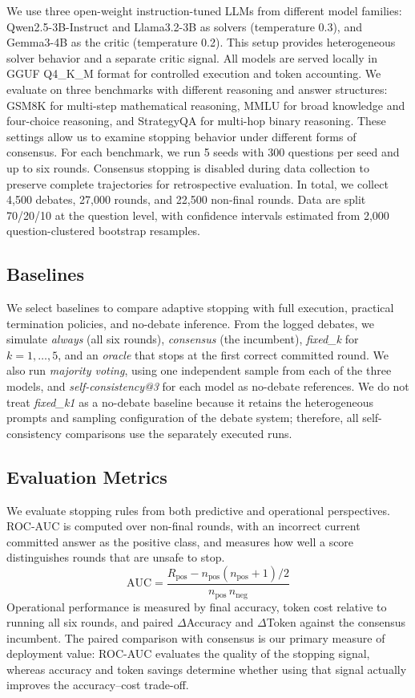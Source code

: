 \documentclass{llncs}
\begin{document}
We use three open-weight instruction-tuned LLMs from different model families: Qwen2.5-3B-Instruct and Llama3.2-3B as solvers (temperature 0.3), and Gemma3-4B as the critic (temperature 0.2). This setup provides heterogeneous solver behavior and a separate critic signal. All models are served locally in GGUF Q4\_K\_M format for controlled execution and token accounting. We evaluate on three benchmarks with different reasoning and answer structures: GSM8K for multi-step mathematical reasoning, MMLU for broad knowledge and four-choice reasoning, and StrategyQA for multi-hop binary reasoning. These settings allow us to examine stopping behavior under different forms of consensus. For each benchmark, we run 5 seeds with 300 questions per seed and up to six rounds. Consensus stopping is disabled during data collection to preserve complete trajectories for retrospective evaluation. In total, we collect 4,500 debates, 27,000 rounds, and 22,500 non-final rounds. Data are split 70/20/10 at the question level, with confidence intervals estimated from 2,000 question-clustered bootstrap resamples.

\subsection{Baselines}
\label{sec:baselines}

We select baselines to compare adaptive stopping with full execution, practical termination policies, and no-debate inference. From the logged debates, we simulate \emph{always} (all six rounds), \emph{consensus} (the incumbent), \emph{fixed\_k} for $k=1,\ldots,5$, and an \emph{oracle} that stops at the first correct committed round. We also run \emph{majority voting}, using one independent sample from each of the three models, and \emph{self-consistency@3} \cite{ref_10} for each model as no-debate references. We do not treat \emph{fixed\_k1} as a no-debate baseline because it retains the heterogeneous prompts and sampling configuration of the debate system; therefore, all self-consistency comparisons use the separately executed runs.

\subsection{Evaluation Metrics}

We evaluate stopping rules from both predictive and operational perspectives. ROC-AUC is computed over non-final rounds, with an incorrect current committed answer as the positive class, and measures how well a score distinguishes rounds that are unsafe to stop. 
\begin{equation}
\mathrm{AUC} = \frac{R_\text{pos} - n_\text{pos}(n_\text{pos}+1)/2}{n_\text{pos}\, n_\text{neg}}
\label{eq:auc}
\end{equation}
Operational performance is measured by final accuracy, token cost relative to running all six rounds, and paired $\Delta$Accuracy and $\Delta$Token against the consensus incumbent. The paired comparison with consensus is our primary measure of deployment value: ROC-AUC evaluates the quality of the stopping signal, whereas accuracy and token savings determine whether using that signal actually improves the accuracy--cost trade-off.
\end{document}
